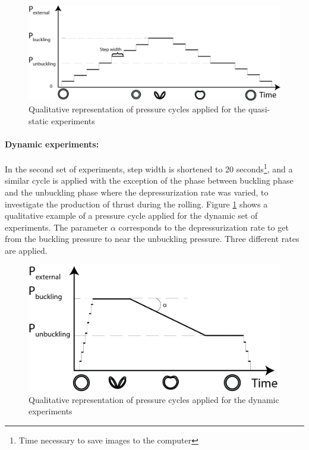 \begin{figure}[H] %
	\centering%
  \includegraphics[width=\textwidth]{figures/Chapter_1/quasi_static_pressure_cycle.png}
	\caption{Qualitative representation of pressure cycles applied for the quasi-static experiments}
	\label{fig:quasi_static_pressure_cycle}
\end{figure}
\paragraph{Dynamic experiments:}
In the second set of experiments, step width is shortened to 20 seconds\footnote{Time necessary to save images to the computer}, and a similar cycle is applied with the exception of the phase between buckling phase and the unbuckling phase where the depressurization rate was varied, to investigate the production of thrust during the rolling. 
Figure \ref{fig:quasi_static_pressure_cycle} shows a qualitative example of a pressure cycle applied for the dynamic set of experiments. The parameter $\alpha$ corresponds to the depressurization rate to get from the buckling pressure to near the unbuckling pressure. Three different rates are applied.
\begin{figure}[H] %
	\centering%
  \includegraphics[width=\textwidth]{figures/Chapter_1/dynamic_pressure_cycle.png}
	\caption{Qualitative representation of pressure cycles applied for the dynamic experiments}
	\label{fig:dynamic_pressure_cycle}
\end{figure}
